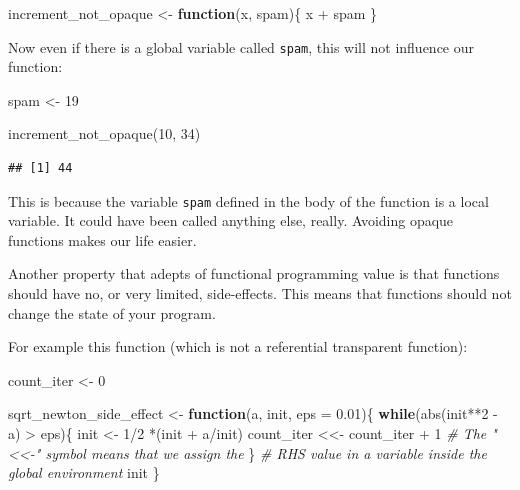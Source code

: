 \documentclass[
]{article}
\newenvironment{Shaded}{\begin{snugshade}}{\end{snugshade}}
\newcommand{\AttributeTok}[1]{\textcolor[rgb]{0.77,0.63,0.00}{#1}}
\newcommand{\CommentTok}[1]{\textcolor[rgb]{0.56,0.35,0.01}{\textit{#1}}}
\newcommand{\ControlFlowTok}[1]{\textcolor[rgb]{0.13,0.29,0.53}{\textbf{#1}}}
\newcommand{\DecValTok}[1]{\textcolor[rgb]{0.00,0.00,0.81}{#1}}
\newcommand{\FloatTok}[1]{\textcolor[rgb]{0.00,0.00,0.81}{#1}}
\newcommand{\FunctionTok}[1]{\textcolor[rgb]{0.00,0.00,0.00}{#1}}
\newcommand{\NormalTok}[1]{#1}
\newcommand{\OtherTok}[1]{\textcolor[rgb]{0.56,0.35,0.01}{#1}}
\newcommand{\SpecialCharTok}[1]{\textcolor[rgb]{0.00,0.00,0.00}{#1}}
\begin{document}
\begin{Shaded}
\begin{Highlighting}[]
\NormalTok{increment\_not\_opaque }\OtherTok{\textless{}{-}} \ControlFlowTok{function}\NormalTok{(x, spam)\{}
\NormalTok{    x }\SpecialCharTok{+}\NormalTok{ spam}
\NormalTok{\}}
\end{Highlighting}
\end{Shaded}

Now even if there is a global variable called \texttt{spam}, this will not influence our function:

\begin{Shaded}
\begin{Highlighting}[]
\NormalTok{spam }\OtherTok{\textless{}{-}} \DecValTok{19}

\FunctionTok{increment\_not\_opaque}\NormalTok{(}\DecValTok{10}\NormalTok{, }\DecValTok{34}\NormalTok{)}
\end{Highlighting}
\end{Shaded}

\begin{verbatim}
## [1] 44
\end{verbatim}

This is because the variable \texttt{spam} defined in the body of the function is a local variable. It
could have been called anything else, really. Avoiding opaque functions makes our life easier.

Another property that adepts of functional programming value is that functions should have no, or
very limited, side-effects. This means that functions should not change the state of your program.

For example this function (which is not a referential transparent function):

\begin{Shaded}
\begin{Highlighting}[]
\NormalTok{count\_iter }\OtherTok{\textless{}{-}} \DecValTok{0}

\NormalTok{sqrt\_newton\_side\_effect }\OtherTok{\textless{}{-}} \ControlFlowTok{function}\NormalTok{(a, init, }\AttributeTok{eps =} \FloatTok{0.01}\NormalTok{)\{}
    \ControlFlowTok{while}\NormalTok{(}\FunctionTok{abs}\NormalTok{(init}\SpecialCharTok{**}\DecValTok{2} \SpecialCharTok{{-}}\NormalTok{ a) }\SpecialCharTok{\textgreater{}}\NormalTok{ eps)\{}
\NormalTok{        init }\OtherTok{\textless{}{-}} \DecValTok{1}\SpecialCharTok{/}\DecValTok{2} \SpecialCharTok{*}\NormalTok{(init }\SpecialCharTok{+}\NormalTok{ a}\SpecialCharTok{/}\NormalTok{init)}
\NormalTok{        count\_iter }\OtherTok{\textless{}\textless{}{-}}\NormalTok{ count\_iter }\SpecialCharTok{+} \DecValTok{1} \CommentTok{\# The "\textless{}\textless{}{-}" symbol means that we assign the}
\NormalTok{    \}                                 }\CommentTok{\# RHS value in a variable inside the global environment}
\NormalTok{    init}
\NormalTok{\}}
\end{Highlighting}
\end{Shaded}
\end{document}
